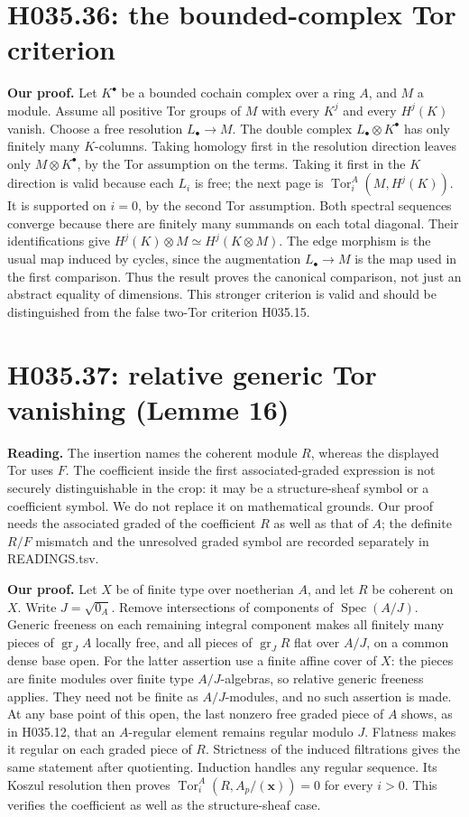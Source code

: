 \section{H035.36: the bounded-complex Tor criterion}
\textbf{Our proof.} Let $K^\bullet$ be a bounded cochain complex
over a ring $A$, and $M$ a module. Assume all positive Tor groups
of $M$ with every $K^j$ and every $H^j(K)$ vanish. Choose a free
resolution $L_\bullet\to M$. The double complex
$L_\bullet\otimes K^\bullet$ has only finitely many $K$-columns.
Taking homology first in the resolution direction leaves only
$M\otimes K^\bullet$, by the Tor assumption on the terms.
Taking it first in the $K$ direction is valid because each $L_i$
is free; the next page is
$\operatorname{Tor}_i^A(M,H^j(K))$. It is supported on $i=0$,
by the second Tor assumption. Both spectral sequences converge
because there are finitely many summands on each total diagonal.
Their identifications give
$H^j(K)\otimes M\simeq H^j(K\otimes M)$. The edge morphism
is the usual map induced by cycles, since the augmentation
$L_\bullet\to M$ is the map used in the first comparison.
Thus the result proves the canonical comparison, not just an
abstract equality of dimensions. This stronger criterion is valid
and should be distinguished from the false two-Tor criterion H035.15.

\section{H035.37: relative generic Tor vanishing (Lemme 16)}
\textbf{Reading.} The insertion names the coherent module $R$,
whereas the displayed Tor uses $F$. The coefficient inside the first
associated-graded expression is not securely distinguishable in the
crop: it may be a structure-sheaf symbol or a coefficient symbol.
We do not replace it on mathematical grounds. Our proof needs the
associated graded of the coefficient $R$ as well as that of $A$;
the definite $R/F$ mismatch and the unresolved graded symbol are
recorded separately in READINGS.tsv.

\textbf{Our proof.} Let $X$ be of finite type over noetherian $A$,
and let $R$ be coherent on $X$. Write $J=\sqrt{0_A}$. Remove
intersections of components of $\operatorname{Spec}(A/J)$.
Generic freeness on each remaining integral component makes
all finitely many pieces of $\operatorname{gr}_J A$ locally free,
and all pieces of $\operatorname{gr}_J R$ flat over $A/J$, on a
common dense base open. For the latter assertion use a finite
affine cover of $X$: the pieces are finite modules over finite
type $A/J$-algebras, so relative generic freeness applies. They
need not be finite as $A/J$-modules, and no such assertion is made.
At any base point of this open, the last nonzero free graded piece
of $A$ shows, as in H035.12, that an $A$-regular element remains
regular modulo $J$. Flatness makes it regular on each graded
piece of $R$. Strictness of the induced filtrations gives the same
statement after quotienting. Induction handles any regular
sequence. Its Koszul resolution then proves
$\operatorname{Tor}_i^A(R,A_p/(\mathbf x))=0$ for every $i>0$.
This verifies the coefficient as well as the structure-sheaf case.

